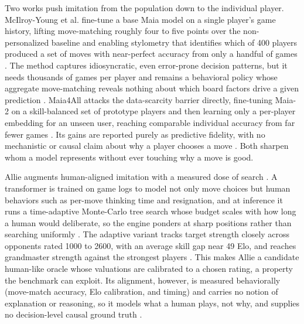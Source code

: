 \documentclass[conference]{IEEEtran}
\begin{document}
Two works push imitation from the population down to the individual player. McIlroy-Young et al. fine-tune a base Maia model on a single player's game history, lifting move-matching roughly four to five points over the non-personalized baseline and enabling stylometry that identifies which of 400 players produced a set of moves with near-perfect accuracy from only a handful of games \cite{ref49}. The method captures idiosyncratic, even error-prone decision patterns, but it needs thousands of games per player and remains a behavioral policy whose aggregate move-matching reveals nothing about which board factors drive a given prediction \cite{ref49}. Maia4All attacks the data-scarcity barrier directly, fine-tuning Maia-2 on a skill-balanced set of prototype players and then learning only a per-player embedding for an unseen user, reaching comparable individual accuracy from far fewer games \cite{ref48}. Its gains are reported purely as predictive fidelity, with no mechanistic or causal claim about why a player chooses a move \cite{ref48}. Both sharpen whom a model represents without ever touching why a move is good.

Allie augments human-aligned imitation with a measured dose of search \cite{ref10}. A transformer is trained on game logs to model not only move choices but human behaviors such as per-move thinking time and resignation, and at inference it runs a time-adaptive Monte-Carlo tree search whose budget scales with how long a human would deliberate, so the engine ponders at sharp positions rather than searching uniformly \cite{ref10}. The adaptive variant tracks target strength closely across opponents rated 1000 to 2600, with an average skill gap near 49 Elo, and reaches grandmaster strength against the strongest players \cite{ref10}. This makes Allie a candidate human-like oracle whose valuations are calibrated to a chosen rating, a property the benchmark can exploit. Its alignment, however, is measured behaviorally (move-match accuracy, Elo calibration, and timing) and carries no notion of explanation or reasoning, so it models what a human plays, not why, and supplies no decision-level causal ground truth \cite{ref10}.
\end{document}
